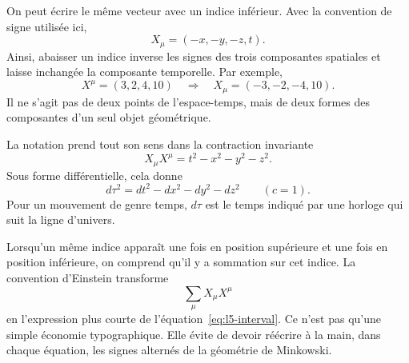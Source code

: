 \begin{classroomqa}\end{classroomqa}

On peut écrire le même vecteur avec un indice inférieur. Avec la convention de signe utilisée ici,
\begin{equation}
X_\mu=(-x,-y,-z,t).
\end{equation}
Ainsi, abaisser un indice inverse les signes des trois composantes spatiales et laisse inchangée la composante temporelle. Par exemple,
\begin{equation}
X^\mu=(3,2,4,10)
\quad\Longrightarrow\quad
X_\mu=(-3,-2,-4,10).
\end{equation}
Il ne s’agit pas de deux points de l’espace-temps, mais de deux formes des composantes d’un seul objet géométrique.

\begin{classroomqa}\end{classroomqa}

La notation prend tout son sens dans la contraction invariante
\begin{equation}
X_\mu X^\mu=t^2-x^2-y^2-z^2.
\label{eq:l5-interval}
\end{equation}
Sous forme différentielle, cela donne
\begin{equation}
d\tau^2=dt^2-dx^2-dy^2-dz^2
\qquad (c=1).
\label{eq:l5-proper-time}
\end{equation}
Pour un mouvement de genre temps, \(d\tau\) est le temps indiqué par une horloge qui suit la ligne d’univers.

Lorsqu’un même indice apparaît une fois en position supérieure et une fois en position inférieure, on comprend qu’il y a sommation sur cet indice. La convention d’Einstein transforme
\begin{equation}
\sum_{\mu}X_\mu X^\mu
\end{equation}
en l’expression plus courte de l’équation~\eqref{eq:l5-interval}. Ce n’est pas qu’une simple économie typographique. Elle évite de devoir réécrire à la main, dans chaque équation, les signes alternés de la géométrie de Minkowski.

